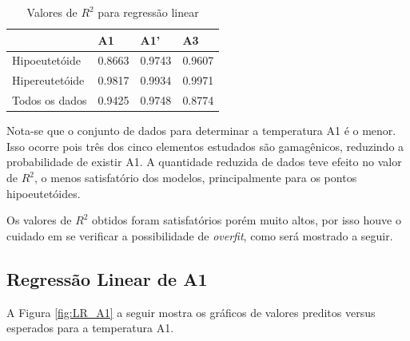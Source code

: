 \documentclass[brazil,tf,epusp]{usp}  %
\begin{document}
\begin{table}
  \caption{Valores de $R^{2}$ para regressão linear}

  \begin{tabular}{llll}
  \hline
  & A1     & A1'    & A3     \\
  \hline
  Hipoeutetóide  & 0.8663 & 0.9743 & 0.9607 \\
  Hipereutetóide & 0.9817 & 0.9934 & 0.9971 \\
  Todos os dados & 0.9425 & 0.9748 & 0.8774 \\
  \hline
  \end{tabular}

  \label{tab:r2_reg_lin}
\end{table}

Nota-se que o conjunto de dados para determinar a temperatura A1 é o menor. Isso ocorre pois três dos cinco elementos estudados são gamagênicos, reduzindo a probabilidade de existir A1. A quantidade reduzida de dados teve efeito no valor de $R^{2}$, o menos satisfatório dos modelos, principalmente para os pontos hipoeutetóides.

Os valores de $R^{2}$ obtidos foram satisfatórios porém muito altos, por isso houve o cuidado em se verificar a possibilidade de \textit{overfit}, como será mostrado a seguir.

\subsection{Regressão Linear de A1}

A Figura \ref{fig:LR_A1} a seguir mostra os gráficos de valores preditos versus esperados para a temperatura A1.
\end{document}
